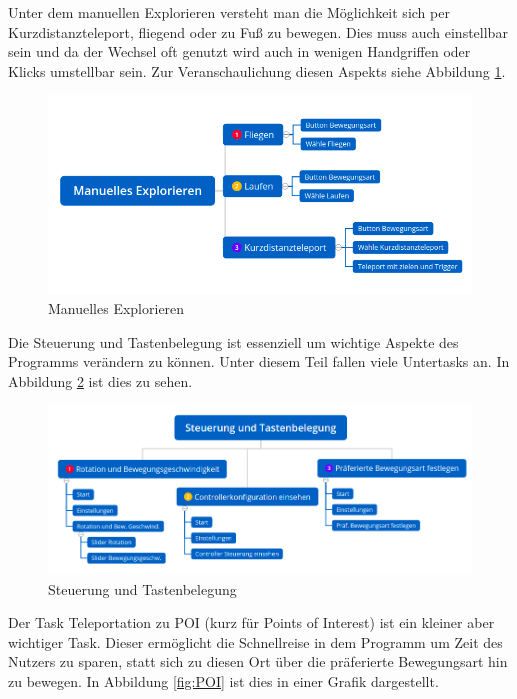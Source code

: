 \documentclass{TUBAFarbeiten}
\begin{document}
Unter dem manuellen Explorieren versteht man die Möglichkeit sich per Kurzdistanzteleport, fliegend oder zu Fuß zu bewegen. Dies muss auch einstellbar sein und da der Wechsel oft genutzt wird auch in wenigen Handgriffen oder Klicks umstellbar sein. Zur Veranschaulichung diesen Aspekts siehe Abbildung \ref{fig:explo}.\\

\begin{figure}
	\centering
	\includegraphics[width=\linewidth]{explorer.png}
	\caption{Manuelles Explorieren}
	\label{fig:explo}
\end{figure}

Die Steuerung und Tastenbelegung ist essenziell um wichtige Aspekte des Programms verändern zu können. Unter diesem Teil fallen viele Untertasks an. In Abbildung \ref{fig:s&t} ist dies zu sehen.

\begin{figure}
	\centering
	\includegraphics[width=\linewidth]{einstellungen.png}
	\caption{Steuerung und Tastenbelegung}
	\label{fig:s&t}
\end{figure}

Der Task Teleportation zu POI (kurz für Points of Interest) ist ein kleiner aber wichtiger Task. Dieser ermöglicht die Schnellreise in dem Programm um Zeit des Nutzers zu sparen, statt sich zu diesen Ort über die präferierte Bewegungsart hin zu bewegen. In Abbildung \ref{fig:POI} ist dies in einer Grafik dargestellt.
\end{document}
